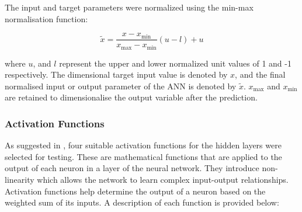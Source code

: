 The input and target parameters were normalized using the min-max normalisation function:

\begin{equation}
	\tilde{x}=\frac{x-x_{\min }}{x_{\max }-x_{\min }}(u-l)+u
\end{equation}

where $u$, and $l$ represent the upper and lower normalized unit values of 1 and -1 respectively. The dimensional target input value is denoted by $x$, and the final normalised input or output parameter of the ANN is denoted by $\tilde{x}$. $x_{\max }$ and $x_{\min }$ are retained to dimensionalise the output variable after the prediction.

\subsubsection{Activation Functions} \label{Activation functions}

As suggested in \cite{Marian2022}, four suitable activation functions for the hidden layers were selected for testing. These are mathematical functions that are applied to the output of each neuron in a layer of the neural network. They introduce non-linearity which allows the network to learn complex input-output relationships. Activation functions help determine the output of a neuron based on the weighted sum of its inputs. A description of each function is provided below:

